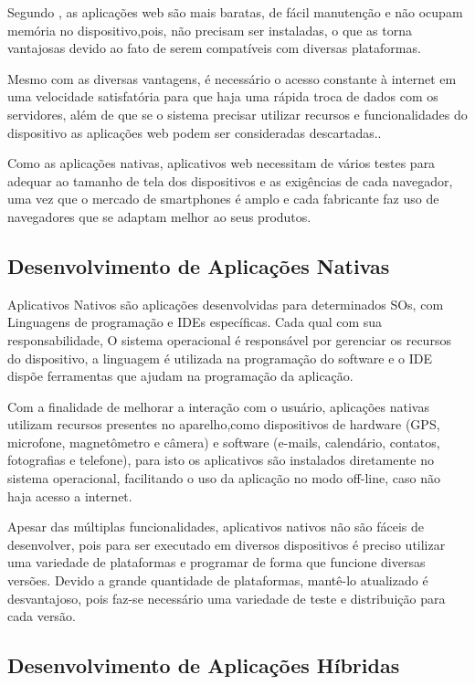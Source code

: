 Segundo , as aplicações web são mais baratas, de fácil manutenção e não ocupam memória no dispositivo,pois, não precisam ser instaladas, o que as torna vantajosas devido ao fato de serem compatíveis com diversas plataformas.

Mesmo com as diversas vantagens, é necessário o acesso constante à internet em uma velocidade satisfatória para que haja uma rápida troca de dados com os servidores, além de que se o sistema precisar utilizar recursos e funcionalidades do dispositivo as aplicações web podem ser consideradas descartadas.\cite{toledo2016desenvolvimento}.

Como as aplicações nativas, aplicativos web necessitam de vários testes para adequar ao tamanho de tela dos dispositivos e as exigências de cada navegador, uma vez que o mercado de smartphones é amplo e cada fabricante faz uso de navegadores que se adaptam melhor ao seus produtos.


\subsection{Desenvolvimento de Aplicações Nativas}

Aplicativos Nativos são aplicações desenvolvidas para determinados SOs, com Linguagens de programação e IDEs específicas. Cada qual com sua responsabilidade, O sistema operacional é responsável por gerenciar os recursos do dispositivo, a linguagem é utilizada na programação do software e o IDE dispõe ferramentas que ajudam na programação da aplicação.

Com a finalidade de melhorar a interação com o usuário, aplicações nativas utilizam recursos presentes no aparelho,como dispositivos de hardware (GPS, microfone, magnetômetro e câmera) e software (e-mails,  calendário, contatos, fotografias e telefone), para isto os aplicativos são instalados diretamente no sistema operacional, facilitando o uso da aplicação no modo off-line, caso não haja acesso a internet.\cite{toledo2016desenvolvimento}

Apesar das múltiplas funcionalidades, aplicativos nativos não são fáceis de desenvolver, pois para ser executado em diversos dispositivos é preciso utilizar uma variedade de plataformas e programar de forma que funcione diversas versões. Devido a grande quantidade de plataformas, mantê-lo atualizado é desvantajoso, pois faz-se necessário uma variedade de teste e distribuição para cada versão.

\subsection{Desenvolvimento de Aplicações Híbridas}

